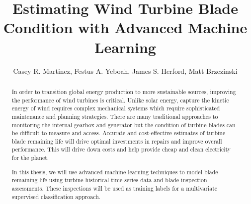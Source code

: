 \documentclass[runningheads]{llncs}
\title{Estimating Wind Turbine Blade Condition with Advanced Machine Learning }
\author{Casey R. Martinez, Festus A. Yeboah, James S. Herford, Matt Brzezinski}
\institute{$^1$Master of Science in Data Science \\ Southern Methodist University \\ Dallas, Texas USA \\ 
\email{\{casianom,fasareyeboah,jherford\}@smu.edu}}
\begin{document}
 

\maketitle 

\begin{abstract} 

In order to transition global energy production to more sustainable sources, improving the performance of wind turbines is critical. Unlike solar energy, capture the kinetic energy of wind requires complex mechanical systems which require sophisticated maintenance and planning strategies. There are many traditional approaches to monitoring the internal gearbox and generator but the condition of turbine blades can be difficult to measure and access. Accurate and cost-effective estimates of turbine blade remaining life will drive optimal investments in repairs and improve overall performance. This will drive down costs and help provide cheap and clean electricity for the planet.

In this thesis, we will use advanced machine learning techniques to model blade remaining life using turbine historical time-series data and blade inspection assessments. These inspections will be used as training labels for a multivariate supervised classification approach. 



\end{abstract} 

  
\end{document}
